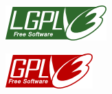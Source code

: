 \documentclass[xcolor=dvipsnames]{beamer}
\begin{document}
\begin{frame}
\begin{columns}
\begin{column}[c]{3cm}
	\begin{figure}
	\includegraphics[scale=0.5]{lgpl3.png}\\
	\end{figure}
	\begin{figure}
	\includegraphics[scale=0.5]{gpl3.png}\\
	\end{figure}
\end{column}
\end{columns}	
\end{frame}
\end{document}
